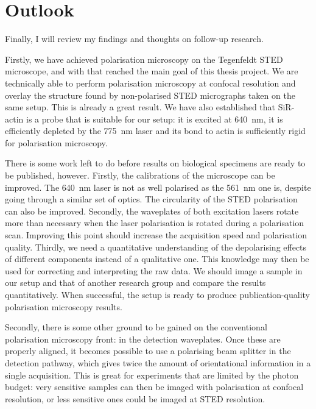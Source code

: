 
\chapter{Outlook}

Finally, I will review my findings and thoughts on follow-up research.

Firstly, we have achieved polarisation microscopy on the Tegenfeldt STED microscope, and with that reached the main goal of this thesis project. We are technically able to perform polarisation microscopy at confocal resolution and overlay the structure found by non-polarised STED micrographs taken on the same setup. This is already a great result. We have also established that SiR-actin is a probe that is suitable for our setup: it is excited at 640~nm, it is efficiently depleted by the 775~nm laser and its bond to actin is sufficiently rigid for polarisation microscopy.

There is some work left to do before results on biological specimens are ready to be published, however. Firstly, the calibrations of the microscope can be improved. The 640~nm laser is not as well polarised as the 561~nm one is, despite going through a similar set of optics. The circularity of the STED polarisation can also be improved. Secondly, the waveplates of both excitation lasers rotate more than necessary when the laser polarisation is rotated during a polarisation scan. Improving this point should increase the acquisition speed and polarisation quality. Thirdly, we need a quantitative understanding of the depolarising effects of different components instead of a qualitative one. This knowledge may then be used for correcting and interpreting the raw data. We should image a sample in our setup and that of another research group and compare the results quantitatively. When successful, the setup is ready to produce publication-quality polarisation microscopy results.

Secondly, there is some other ground to be gained on the conventional polarisation microscopy front: in the detection waveplates. Once these are properly aligned, it becomes possible to use a polarising beam splitter in the detection pathway, which gives twice the amount of orientational information in a single acquisition. This is great for experiments that are limited by the photon budget: very sensitive samples can then be imaged with polarisation at confocal resolution, or less sensitive ones could be imaged at STED resolution.

